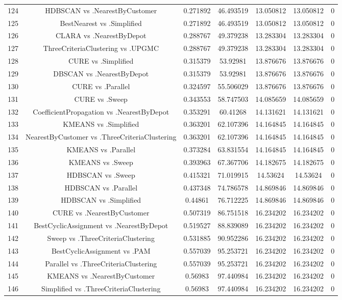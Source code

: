 \documentclass[a4paper,10pt]{article}
\begin{document}
\begin{landscape}
\begin{table}[!htp]
\begin{tabular}{ccccccc}
124&HDBSCAN vs .NearestByCustomer&0.271892&46.493519&13.050812&13.050812&0\\
125&BestNearest vs .Simplified&0.271892&46.493519&13.050812&13.050812&0\\
126&CLARA vs .NearestByDepot&0.288767&49.379238&13.283304&13.283304&0\\
127&ThreeCriteriaClustering vs .UPGMC&0.288767&49.379238&13.283304&13.283304&0\\
128&CURE vs .Simplified&0.315379&53.92981&13.876676&13.876676&0\\
129&DBSCAN vs .NearestByDepot&0.315379&53.92981&13.876676&13.876676&0\\
130&CURE vs .Parallel&0.324597&55.506029&13.876676&13.876676&0\\
131&CURE vs .Sweep&0.343553&58.747503&14.085659&14.085659&0\\
132&CoefficientPropagation vs .NearestByDepot&0.353291&60.41268&14.131621&14.131621&0\\
133&KMEANS vs .Simplified&0.363201&62.107396&14.164845&14.164845&0\\
134&NearestByCustomer vs .ThreeCriteriaClustering&0.363201&62.107396&14.164845&14.164845&0\\
135&KMEANS vs .Parallel&0.373284&63.831554&14.164845&14.164845&0\\
136&KMEANS vs .Sweep&0.393963&67.367706&14.182675&14.182675&0\\
137&HDBSCAN vs .Sweep&0.415321&71.019915&14.53624&14.53624&0\\
138&HDBSCAN vs .Parallel&0.437348&74.786578&14.869846&14.869846&0\\
139&HDBSCAN vs .Simplified&0.44861&76.712225&14.869846&14.869846&0\\
140&CURE vs .NearestByCustomer&0.507319&86.751518&16.234202&16.234202&0\\
141&BestCyclicAssignment vs .NearestByDepot&0.519527&88.839089&16.234202&16.234202&0\\
142&Sweep vs .ThreeCriteriaClustering&0.531885&90.952286&16.234202&16.234202&0\\
143&BestCyclicAssignment vs .PAM&0.557039&95.253721&16.234202&16.234202&0\\
144&Parallel vs .ThreeCriteriaClustering&0.557039&95.253721&16.234202&16.234202&0\\
145&KMEANS vs .NearestByCustomer&0.56983&97.440984&16.234202&16.234202&0\\
146&Simplified vs .ThreeCriteriaClustering&0.56983&97.440984&16.234202&16.234202&0\\

\end{tabular}
\end{table}
\end{landscape}
\end{document}
